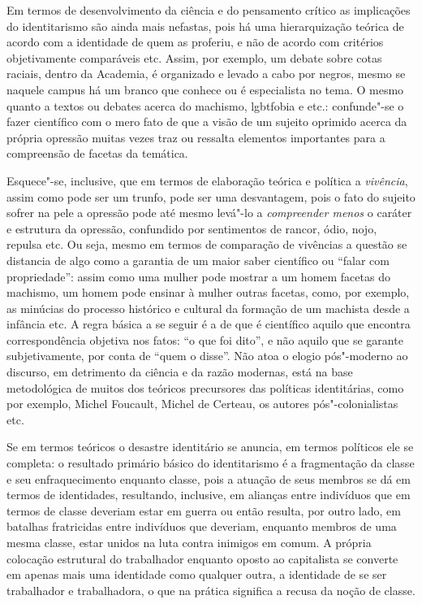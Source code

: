 Em termos de desenvolvimento da ciência e do pensamento crítico as
implicações do identitarismo são ainda mais nefastas, pois há uma
hierarquização teórica de acordo com a identidade de quem as proferiu, e
não de acordo com critérios objetivamente comparáveis etc. Assim, por
exemplo, um debate sobre cotas raciais, dentro da Academia, é organizado
e levado a cabo por negros, mesmo se naquele campus há um branco que
conhece ou é especialista no tema. O mesmo quanto a textos ou debates
acerca do machismo, lgbtfobia e etc.: confunde"-se o fazer científico com
o mero fato de que a visão de um sujeito oprimido acerca da própria
opressão muitas vezes traz ou ressalta elementos importantes para a
compreensão de facetas da temática.

Esquece"-se, inclusive, que em termos de elaboração teórica e política a
\emph{vivência}, assim como pode ser um trunfo, pode ser uma
desvantagem, pois o fato do sujeito sofrer na pele a opressão pode até
mesmo levá"-lo a \emph{compreender menos} o caráter e estrutura da
opressão, confundido por sentimentos de rancor, ódio, nojo, repulsa etc.
Ou seja, mesmo em termos de comparação de vivências a questão se
distancia de algo como a garantia de um maior saber científico ou
``falar com propriedade'': assim como uma mulher pode mostrar a um homem
facetas do machismo, um homem pode ensinar à mulher outras facetas,
como, por exemplo, as minúcias do processo histórico e cultural da
formação de um machista desde a infância etc. A regra básica a se seguir
é a de que é científico aquilo que encontra correspondência objetiva nos
fatos: ``o que foi dito'', e não aquilo que se garante subjetivamente,
por conta de ``quem o disse''. Não atoa o elogio pós"-moderno ao
discurso, em detrimento da ciência e da razão modernas, está na base
metodológica de muitos dos teóricos precursores das políticas
identitárias, como por exemplo, Michel Foucault, Michel de Certeau, os
autores pós"-colonialistas etc.

Se em termos teóricos o desastre identitário se anuncia, em termos
políticos ele se completa: o resultado primário básico do identitarismo
é a fragmentação da classe e seu enfraquecimento enquanto classe, pois a
atuação de seus membros se dá em termos de identidades, resultando,
inclusive, em alianças entre indivíduos que em termos de classe deveriam
estar em guerra ou então resulta, por outro lado, em batalhas
fratricidas entre indivíduos que deveriam, enquanto membros de uma mesma
classe, estar unidos na luta contra inimigos em comum. A própria
colocação estrutural do trabalhador enquanto oposto ao capitalista se
converte em apenas mais uma identidade como qualquer outra, a identidade
de se ser trabalhador e trabalhadora, o que na prática significa a
recusa da noção de classe.


